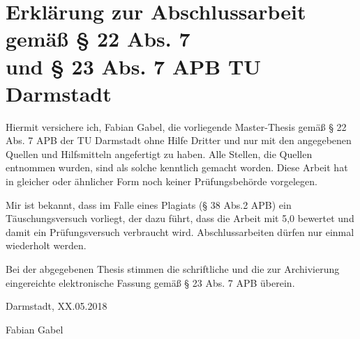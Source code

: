 \thispagestyle{empty}
\section*{Erklärung zur Abschlussarbeit gemäß § 22 Abs. 7 \\und § 23 Abs. 7 APB TU Darmstadt}

Hiermit versichere ich, Fabian Gabel, die vorliegende Master-Thesis gemäß § 22 Abs. 7 APB der TU Darmstadt ohne Hilfe Dritter und nur mit den angegebenen Quellen und Hilfsmitteln angefertigt zu haben. Alle Stellen, die Quellen entnommen wurden, sind als solche kenntlich gemacht worden. Diese Arbeit hat in gleicher oder ähnlicher Form noch keiner Prüfungsbehörde vorgelegen. 

Mir ist bekannt, dass im Falle eines Plagiats (§ 38 Abs.2 APB) ein Täuschungsversuch vorliegt, der dazu führt, dass die Arbeit mit 5,0 bewertet und damit ein Prüfungsversuch verbraucht wird. Abschlussarbeiten dürfen nur einmal wiederholt werden.

Bei der abgegebenen Thesis stimmen die schriftliche und die zur Archivierung eingereichte elektronische Fassung gemäß § 23 Abs. 7 APB überein.

%
%
%
\vspace{20pt}


\noindent
Darmstadt, XX.05.2018\vspace{70pt}


\noindent
Fabian Gabel
